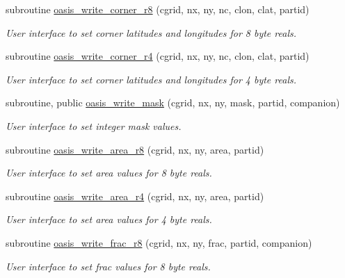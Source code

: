 \begin{DoxyCompactItemize}
subroutine \hyperlink{namespacemod__oasis__grid_af6953999aa6fb1d0190187052bf52671}{oasis\+\_\+write\+\_\+corner\+\_\+r8} (cgrid, nx, ny, nc, clon, clat, partid)
\begin{DoxyCompactList}\small\item\em User interface to set corner latitudes and longitudes for 8 byte reals. \end{DoxyCompactList}\item 
subroutine \hyperlink{namespacemod__oasis__grid_a30e5d9c4766b2f323d4b930499e0f23b}{oasis\+\_\+write\+\_\+corner\+\_\+r4} (cgrid, nx, ny, nc, clon, clat, partid)
\begin{DoxyCompactList}\small\item\em User interface to set corner latitudes and longitudes for 4 byte reals. \end{DoxyCompactList}\item 
subroutine, public \hyperlink{namespacemod__oasis__grid_ae8c451c5d0190f1077107419283d2a6a}{oasis\+\_\+write\+\_\+mask} (cgrid, nx, ny, mask, partid, companion)
\begin{DoxyCompactList}\small\item\em User interface to set integer mask values. \end{DoxyCompactList}\item 
subroutine \hyperlink{namespacemod__oasis__grid_ae54eaec7b4e9d4877af0ce8537b0b256}{oasis\+\_\+write\+\_\+area\+\_\+r8} (cgrid, nx, ny, area, partid)
\begin{DoxyCompactList}\small\item\em User interface to set area values for 8 byte reals. \end{DoxyCompactList}\item 
subroutine \hyperlink{namespacemod__oasis__grid_ad1d3e95cf63a2277b82167ec6c8148d4}{oasis\+\_\+write\+\_\+area\+\_\+r4} (cgrid, nx, ny, area, partid)
\begin{DoxyCompactList}\small\item\em User interface to set area values for 4 byte reals. \end{DoxyCompactList}\item 
subroutine \hyperlink{namespacemod__oasis__grid_acf5aadf5df317f065c5ced3de9662aac}{oasis\+\_\+write\+\_\+frac\+\_\+r8} (cgrid, nx, ny, frac, partid, companion)
\begin{DoxyCompactList}\small\item\em User interface to set frac values for 8 byte reals. \end{DoxyCompactList}\item 

\end{DoxyCompactItemize}

